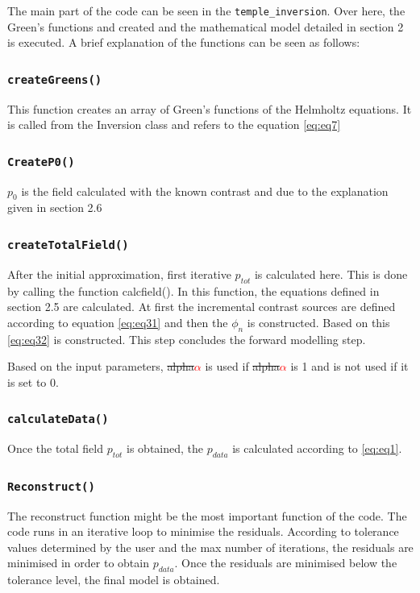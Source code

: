\documentclass[10pt,a4paper]{article}
\newcommand{\newstm}[1]{\textcolor{red}{\textbf{#1}}}
\newcommand{\oldstm}[1]{\sout{#1}}
\begin{document}
The main part of the code can be seen in the \texttt{temple\_inversion}. Over here, the Green's functions and created and the mathematical model detailed in section 2 is executed. A brief explanation of the functions can be seen as follows:

\subsubsection{\texttt{createGreens()}}

This function creates an array of Green's functions of the  Helmholtz equations. It is called from the Inversion class and refers to the equation \ref{eq:eq7}

\subsubsection{\texttt{CreateP0()}}
$p_0$ is the field calculated with the known contrast and due to the explanation given in section 2.6

\subsubsection{\texttt{createTotalField()}}

After the initial approximation, first iterative $p_{tot}$ is calculated here. This is done by calling the function calcfield(). In this function, the equations defined in section 2.5 are calculated. At first the incremental contrast sources are defined according to equation \ref{eq:eq31} and then the $\phi_n$ is constructed. Based on this \ref{eq:eq32} is constructed. This step concludes the forward modelling step.
\newline

Based on the input parameters, \oldstm{alpha}\newstm{$\alpha$} is used if \oldstm{alpha}\newstm{$\alpha$} is 1 and is not used if it is set to 0.

\subsubsection{\texttt{calculateData()}}
Once the total field $p_{tot}$ is obtained, the $p_{data}$ is calculated according to \ref{eq:eq1}.

\subsubsection{\texttt{Reconstruct()}}
The reconstruct function might be the most important function of the code. The code runs in an iterative loop to minimise the residuals. According to tolerance values determined by the user and the max number of iterations, the residuals are minimised in order to obtain $p_{data}$. Once the residuals are minimised below the tolerance level, the final model is obtained.
\newline
\end{document}

